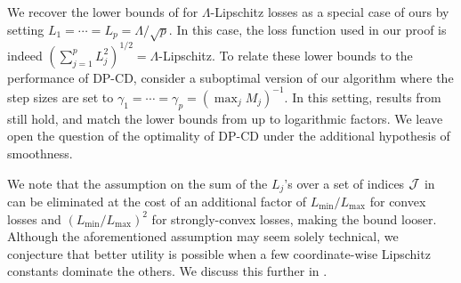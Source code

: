 We recover the lower bounds of \citet{bassily2014Private} for
$\Lambda$-Lipschitz
losses as a special case of ours by setting $L_1 = \cdots = L_p = {\Lambda}/{
  \sqrt{p}}$. In this case, the
loss function used in our proof is indeed $(\sum_{j=1}^p L_j^2)^{1/2}
  =\Lambda$-Lipschitz.
To relate these lower bounds to the performance of DP-CD, consider a
suboptimal version of
our algorithm where the step sizes are set to
$\gamma_1 = \cdots = \gamma_p = ({\max_j M_j})^{-1}$.
In this setting, results from  still hold, and match the
lower bounds from  up to logarithmic factors.
We leave open the question of the optimality of DP-CD under the additional
hypothesis of smoothness.

We note that the assumption on the sum of the $L_j$'s over a set of indices
$\mathcal J$ in  can be eliminated at the cost of an
additional
factor of ${L_{\min}}/{L_{\max}}$ for convex losses and
$({L_{\min}}/{L_{\max}})^2$ for strongly-convex losses, making the bound looser.
Although the aforementioned assumption may seem solely technical, we
conjecture that better utility is possible when a few
coordinate-wise Lipschitz constants dominate the others.
We discuss this further in .


